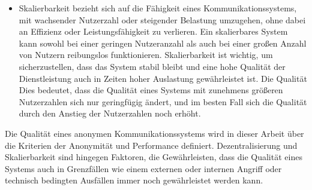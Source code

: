 \begin{itemize}
\item Skalierbarkeit bezieht sich auf die Fähigkeit eines Kommunikationssystems, mit wachsender Nutzerzahl oder steigender Belastung umzugehen, ohne dabei an Effizienz oder Leistungsfähigkeit zu verlieren. Ein skalierbares System kann sowohl bei einer geringen Nutzeranzahl als auch bei einer großen Anzahl von Nutzern reibungslos funktionieren. Skalierbarkeit ist wichtig, um sicherzustellen, dass das System stabil bleibt und eine hohe Qualität der Dienstleistung auch in Zeiten hoher Auslastung gewährleistet ist. Die Qualität Dies bedeutet, dass die Qualität eines Systems mit zunehmens größeren Nutzerzahlen sich nur geringfügig ändert, und im besten Fall sich die Qualität durch den Anstieg der Nutzerzahlen noch erhöht.

\end{itemize}

Die Qualität eines anonymen Kommunikationssystems wird in dieser Arbeit über die Kriterien der Anonymität und Performance definiert. Dezentralisierung und Skalierbarkeit sind hingegen Faktoren, die Gewährleisten, dass die Qualität eines Systems auch in Grenzfällen wie einem externen oder internen Angriff oder technisch bedingten Ausfällen immer noch gewährleistet werden kann.